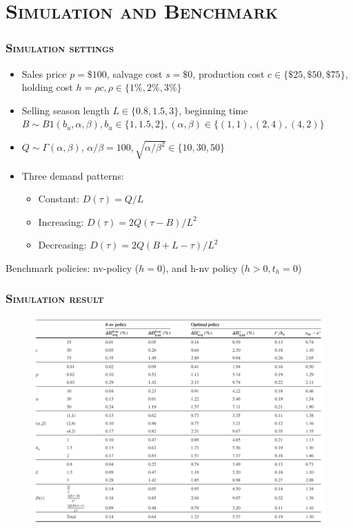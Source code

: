 \documentclass[aspectratio=169]{../presentation}
\begin{document}
    \section{\textsc{Simulation and Benchmark}}

    \begin{frame}
        \frametitle{\textsc{Simulation settings}}

        \begin{itemize}
            \item Sales price $p=\$100$, salvage cost $s = \$0$, production cost $c\in \{\$25, \$50, \$75\}$, holding cost $h = \rho c, \rho\in \{1\%, 2\%, 3\%\}$
            \item Selling season length $L\in \{0.8, 1.5, 3\}$, beginning time $B\sim B1(b_u, \alpha, \beta), b_u\in \{1, 1.5, 2\}, (\alpha, \beta)\in \{(1, 1), (2, 4), (4, 2)\}$
            \item $Q\sim \Gamma(\alpha, \beta)$, $\alpha/\beta = 100, \sqrt{\alpha / \beta^2} \in \{10, 30, 50\}$
            \item Three demand patterns:
            \begin{itemize}
                \item Constant: $D(\tau) = Q/L$
                \item Increasing: $D(\tau) = 2Q(\tau - B)/L^2$
                \item Decreasing: $D(\tau) = 2Q(B + L - \tau)/L^2$
            \end{itemize}
        \end{itemize}

        Benchmark policies: nv-policy ($h = 0$), and h-nv policy ($h > 0, t_h = 0$)

    \end{frame}

    \begin{frame}
        \frametitle{\textsc{Simulation result}}

        \begin{figure}[ht]
            \includegraphics[width=0.65\linewidth]{imgs/gp01-2.png}
        \end{figure}

    \end{frame}
\end{document}
